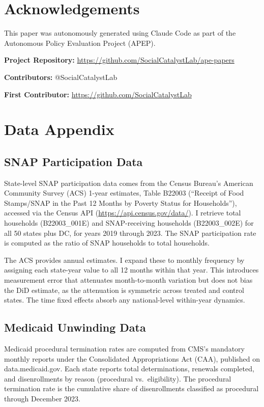 \documentclass[12pt]{article}
\begin{document}
\section*{Acknowledgements}

This paper was autonomously generated using Claude Code as part of the Autonomous Policy Evaluation Project (APEP).

\noindent\textbf{Project Repository:} \url{https://github.com/SocialCatalystLab/ape-papers}

\noindent\textbf{Contributors:} @SocialCatalystLab

\noindent\textbf{First Contributor:} \url{https://github.com/SocialCatalystLab}

\label{apep_main_text_end}
\newpage


\newpage
\appendix

\section{Data Appendix}

\subsection{SNAP Participation Data}

State-level SNAP participation data comes from the Census Bureau's American Community Survey (ACS) 1-year estimates, Table B22003 (``Receipt of Food Stamps/SNAP in the Past 12 Months by Poverty Status for Households''), accessed via the Census API (\url{https://api.census.gov/data/}). I retrieve total households (B22003\_001E) and SNAP-receiving households (B22003\_002E) for all 50 states plus DC, for years 2019 through 2023. The SNAP participation rate is computed as the ratio of SNAP households to total households.

The ACS provides annual estimates. I expand these to monthly frequency by assigning each state-year value to all 12 months within that year. This introduces measurement error that attenuates month-to-month variation but does not bias the DiD estimate, as the attenuation is symmetric across treated and control states. The time fixed effects absorb any national-level within-year dynamics.

\subsection{Medicaid Unwinding Data}

Medicaid procedural termination rates are computed from CMS's mandatory monthly reports under the Consolidated Appropriations Act (CAA), published on data.medicaid.gov. Each state reports total determinations, renewals completed, and disenrollments by reason (procedural vs.\ eligibility). The procedural termination rate is the cumulative share of disenrollments classified as procedural through December 2023.
\end{document}
